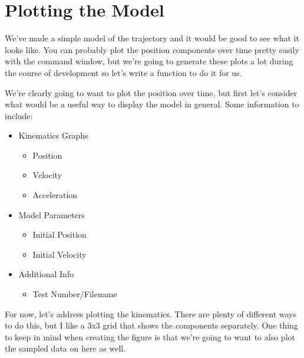 \documentclass[12pt, letterpaper]{article}
\begin{document}
\section{Plotting the Model}
We've made a simple model of the trajectory and it would be good to see what it looks like. You can probably plot the position components over time pretty easily with the command window, but we're going to generate these plots a lot during the course of development so let's write a function to do it for us. 

We're clearly going to want to plot the position over time, but first let's consider what would be a useful way to display the model in general. Some information to include:
\begin{itemize}
\item Kinematics Graphs
\begin{itemize}
\item Position
\item Velocity
\item Acceleration
\end{itemize}
\item Model Parameters
\begin{itemize}
\item Initial Position
\item Initial Velocity
\end{itemize}
\item Additional Info
\begin{itemize}
\item Test Number/Filename
\end{itemize} 
\end{itemize}
For now, let's address plotting the kinematics. There are plenty of different ways to do this, but I like a 3x3 grid that shows the components separately. One thing to keep in mind when creating the figure is that we're going to want to also plot the sampled data on here as well.
\end{document}
